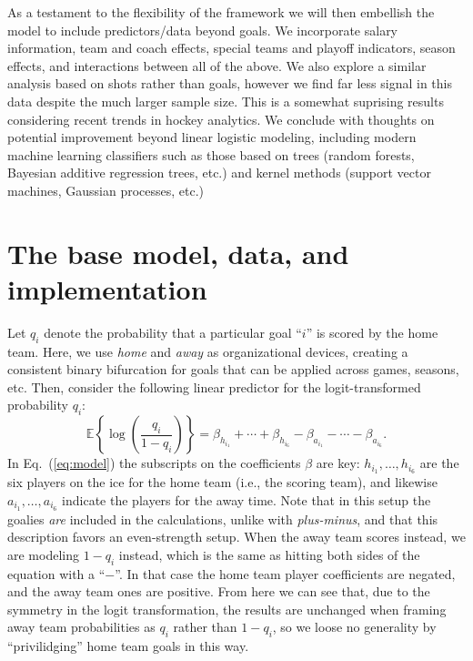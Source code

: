 As a testament to the flexibility of the framework we will then embellish the
model to include predictors/data beyond goals.  We incorporate salary
information, team and coach effects, special teams and playoff indicators,
season effects, and interactions between all of the above.  We also explore a
similar analysis based on shots rather than goals, however we find far less
signal in this data despite the much larger sample size.  This is a somewhat
suprising results considering recent trends in hockey analytics.  We conclude
with thoughts on potential improvement beyond linear logistic modeling,
including modern machine learning classifiers such as those based on trees
(random forests, Bayesian additive regression trees, etc.) and kernel methods
(support vector machines, Gaussian processes, etc.)


\section{The base model, data, and implementation}
\label{sec:base}

Let $q_i$ denote the probability that a particular goal ``$i$'' is scored by
the home team.  Here, we use {\em home} and {\em away} as organizational devices,
creating a consistent binary bifurcation for goals that can be applied across games,
seasons, etc.  Then, consider the following linear predictor
for the logit-transformed probability $q_i$:
\begin{equation}
\mathbb{E}\left\{\log \left(\frac{q_i}{1-q_i} \right)\right\} 
= \beta_{h_{i_1}} + \cdots + \beta_{h_{i_6}} - 
\beta_{a_{i_1}} - \cdots - \beta_{a_{i_6}}.
\label{eq:model}
\end{equation}
In Eq.~(\ref{eq:model}) the subscripts on the coefficients $\beta$ are
key: $h_{i_1}, \dots, h_{i_6}$ are the six players on the ice for the home
team (i.e., the scoring team), and likewise $a_{i_1}, \dots, a_{i_6}$ indicate
the players for the away time.  Note that in this setup the goalies {\em are}
included in the calculations, unlike with {\em plus-minus}, and that this
description favors an even-strength setup.  When the away team scores instead,
we are modeling $1-q_i$ instead, which is the same as hitting both sides of
the equation with a ``$-$''.  In that case the home team player coefficients
are negated, and the away team ones are positive.  From here we can see that,
due to the symmetry in the logit transformation, the results are unchanged
when framing away team probabilities as $q_i$ rather than $1-q_i$, so we loose
no generality by ``privilidging'' home team goals in this way.

